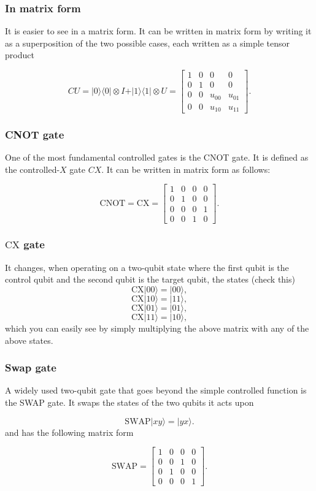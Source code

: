 \documentclass{beamer}
\begin{document}
\begin{frame}
\frametitle{In matrix form}

It is easier to see in a matrix form.
It can be written in matrix form by writing it as a superposition of
the two possible cases, each written as a simple tensor product

\[
CU = \vert 0\rangle\langle 0\vert\otimes I + \vert 1\rangle\langle 1 \vert \otimes U=\begin{bmatrix}
1 & 0 & 0 & 0 \\
0 & 1 & 0 & 0 \\
0 & 0 & u_{00} & u_{01} \\
0 & 0 & u_{10} & u_{11}
\end{bmatrix}.
\]
\end{frame}

\begin{frame}
\frametitle{CNOT gate}

One of the most fundamental controlled gates is the CNOT gate. It is
defined as the controlled-$X$ gate $CX$. It can be written in matrix form as follows:

\[
\mathrm{CNOT}=\mathrm{CX}=\begin{bmatrix}
1 & 0 & 0 & 0 \\
0 & 1 & 0 & 0 \\
0 & 0 & 0 & 1 \\
0 & 0 & 1 & 0
\end{bmatrix}.
\]
\end{frame}

\begin{frame}
\frametitle{$\mathrm{CX}$ gate}

It changes, when operating on a two-qubit state where the first qubit is the control qubit and the second qubit is the target qubit, the states (check this)
\[
\mathrm{CX}\vert 00\rangle=\vert 00\rangle,
\]
\[
\mathrm{CX}\vert 10\rangle= \vert 11\rangle,
\]
\[
\mathrm{CX}\vert 01\rangle= \vert 01\rangle,
\]
\[
\mathrm{CX}\vert 11\rangle= \vert 10\rangle,
\]
which you can easily see by simply multiplying the above matrix with any of the above states.
\end{frame}

\begin{frame}
\frametitle{Swap gate}

A widely used two-qubit gate that goes beyond the simple controlled function is the SWAP gate. It swaps the states of the two qubits it acts upon

\[
\mathrm{SWAP}\vert xy\rangle=\vert yx\rangle.
\]
and has the following matrix form

\[
\mathrm{SWAP}
=\begin{bmatrix}
1 & 0 & 0 & 0 \\
0 & 0 & 1 & 0 \\
0 & 1 & 0 & 0 \\
0 & 0 & 0 & 1
\end{bmatrix}.
\]
\end{frame}
\end{document}

